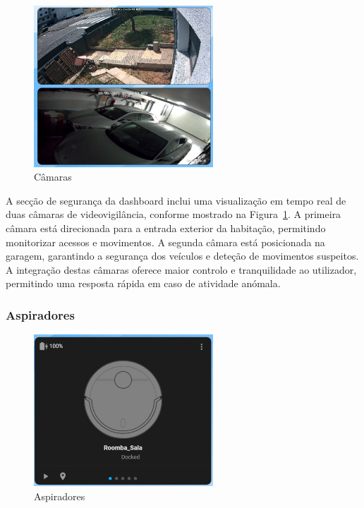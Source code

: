 \begin{figure}[H]
    \centering
    \includegraphics[width=0.6\textwidth]{images/camaras_main.png}
    \caption{Câmaras}
    \label{fig:camaras_main.png}
\end{figure}

A secção de segurança da dashboard inclui uma visualização em tempo real de duas câmaras de videovigilância, conforme mostrado na Figura~\ref{fig:camaras_main.png}. A primeira câmara está direcionada para a entrada exterior da habitação, permitindo monitorizar acessos e movimentos. A segunda câmara está posicionada na garagem, garantindo a segurança dos veículos e deteção de movimentos suspeitos. A integração destas câmaras oferece maior controlo e tranquilidade ao utilizador, permitindo uma resposta rápida em caso de atividade anómala.

\subsubsection{Aspiradores}

\begin{figure}[H]
    \centering
    \includegraphics[width=0.6\textwidth]{images/aspiradores_main.png}
    \caption{Aspiradores}
    \label{fig:aspiradores_main.png}
\end{figure}

